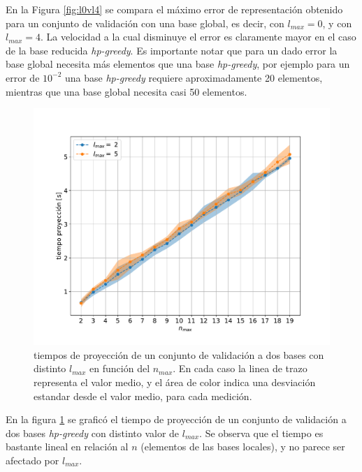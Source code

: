 En la Figura \ref{fig:l0vl4} se compara el máximo error de representación obtenido para un conjunto de validación con una base global, es decir, con $l_{max} = 0$, y con $l_{max}=4$. La velocidad a la cual disminuye el error es claramente mayor en el caso de la base reducida \textit{hp-greedy}. Es importante notar que para un dado error la base global necesita más elementos que una base \textit{hp-greedy}, por ejemplo para un error de $10^{-2}$ una base \textit{hp-greedy} requiere aproximadamente 20 elementos, mientras que una base global necesita casi 50 elementos. 



\begin{figure}[h!]
\centering
\includegraphics[width=.8\columnwidth ,trim={0, 1cm, 0, 1.2cm}]{figs/t_vs_nmax.pdf}
\caption{tiempos de proyección de un conjunto de validación a dos bases con distinto $l_{max}$ en función del $n_{max}$. En cada caso la linea de trazo representa el valor medio, y el área de color indica una desviación estandar desde el valor medio, para cada medición.}
\label{fig:t_vs_nmax}
\end{figure}


En la figura \ref{fig:t_vs_nmax} se graficó el tiempo de proyección de un conjunto de validación a dos bases \textit{hp-greedy} con distinto valor de $l_{max}$. Se observa que el tiempo es bastante lineal en relación al $n$ (elementos de las bases locales), y no parece ser afectado por $l_{max}$. 


